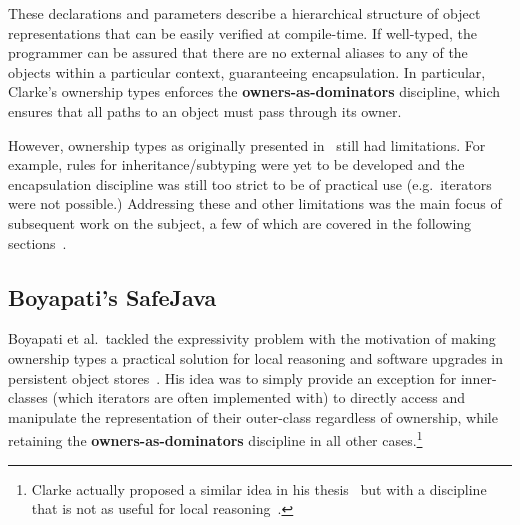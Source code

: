 \documentclass{acm_proc_article-sp}
\begin{document}
These declarations and parameters describe a hierarchical structure of object
representations that can be easily verified at compile-time. If well-typed, the
programmer can be assured that there are no external aliases to any of the
objects within a particular context, guaranteeing encapsulation. In particular,
Clarke's ownership types enforces the \textbf{owners-as-dominators} discipline,
which ensures that all paths to an object must pass through its owner.

However, ownership types as originally presented in~\cite{clarke98ownership}
still had limitations. For example, rules for inheritance/subtyping were yet to
be developed and the encapsulation discipline was still too strict to be of
practical use (e.g.\ iterators were not possible.) Addressing these and other
limitations was the main focus of subsequent work on the subject, a few of
which are covered in the following sections~\cite{boyapati04safejava,
boyapati03innerclass, cunningham08ut, dietl11gut, cameron07mojo}.

%
%
%


\subsection{Boyapati's SafeJava}
\label{subsec:boyapati}

Boyapati et al.\ tackled the expressivity problem with the motivation of making
ownership types a practical solution for local reasoning and software upgrades
in persistent object stores~\cite{boyapati03innerclass}. His idea was to simply
provide an exception for inner-classes (which iterators are often implemented
with) to directly access and manipulate the representation of their outer-class
regardless of ownership, while retaining the \textbf{owners-as-dominators}
discipline in all other cases.\footnote{Clarke actually proposed a similar idea
in his thesis~\cite{clarke03ownership} but with a discipline that is not as
useful for local reasoning~\cite{boyapati03innerclass}.}
\end{document}
